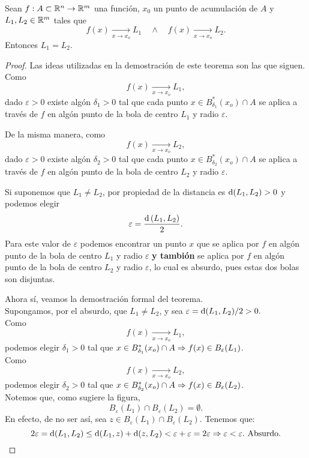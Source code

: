 \begin{theorem} \label{teo:unicidad_limite}
\mbox{}

Sean $f:A \subset \mathbb{R}^n \to \mathbb{R}^m$ una funci\'on, $x_0$ un punto de acumulaci\'on de $A$ y $L_1, L_2 \in \mathbb{R}^m$ tales que 
\[
 f(x) \xrightarrow[x \to x_o]{} L_1 \quad \wedge \quad f(x) \xrightarrow[x \to x_o]{} L_2.
\]
Entonces $L_1 = L_2$.
\begin{proof}
\mbox{}

Las ideas utilizadas en la demostraci\'on de este teorema son las que siguen.\\
Como 
\[
 f(x) \xrightarrow[x \to x_o]{} L_1,
\]
dado $\varepsilon > 0$ existe alg\'on $\delta_1 > 0$ tal que cada punto $x \in B_{\delta_1}^*(x_o) \cap A$ se aplica a trav\'es de $f$ en alg\'on punto de la bola de centro $L_1$ y radio $\varepsilon$.

\def\Ro{2.0}
\def\Rb{1.0}
\def\Ra{3.0}
\def\sep{1.0*\Ro}




De la misma manera, como 
\[
 f(x) \xrightarrow[x \to x_o]{} L_2,
\]
dado $\varepsilon > 0$ existe alg\'on $\delta_2 > 0$ tal que cada punto $x \in B_{\delta_2}^*(x_o) \cap A$ se aplica a trav\'es de $f$ en alg\'on punto de la bola de centro $L_2$ y radio $\varepsilon$.



Si suponemos que $L_1 \ne L_2$, por propiedad de la distancia es $\operatorname{d}(L_1,L_2) > 0$ y podemos elegir 
\[
 \varepsilon = \frac{\operatorname{d}{(L_1,L_2)}}{2}.
\]
Para este valor de $\varepsilon$ podemos encontrar un punto $x$ que se aplica por $f$ en alg\'on punto de la bola de centro $L_1$ y radio $\varepsilon$ \textbf{y tambi\'on} se aplica por $f$ en alg\'on punto de la bola de centro $L_2$ y radio $\varepsilon$, lo cual es absurdo, pues estas dos bolas son disjuntas.



Ahora s\'i, veamos la demostraci\'on formal del teorema.\\
 Supongamos, por el absurdo, que $L_1 \ne L_2$, y sea $\varepsilon = \operatorname{d}(L_1,L_2)/2 > 0.$ \\ 
 Como 
 \[
  f(x) \xrightarrow[x \to x_o]{} L_1,
 \]
podemos elegir $\delta_1 > 0$ tal que $x \in B_{\delta_1}^*(x_o) \cap A \Rightarrow f(x) \in B_{\varepsilon}(L_1)$.\\
Como 
\[
 f(x) \xrightarrow[x \to x_o]{} L_2,
\]
 podemos elegir $\delta_2 > 0$ tal que $x \in B_{\delta_2}^*(x_o) \cap A \Rightarrow f(x) \in B_{\varepsilon}(L_2)$.\\
 Notemos que, como sugiere la figura, 
 \[
  B_{\varepsilon}(L_1) \cap B_{\varepsilon}(L_2) = \emptyset.
 \]
 En efecto, de no ser as\'i, sea $z \in B_{\varepsilon}(L_1) \cap B_{\varepsilon}(L_2)$. Tenemos que:
 \[
  2 \varepsilon = \operatorname{d}(L_1,L_2) \le \operatorname{d}(L_1,z) + \operatorname{d}(z,L_2)
  < \varepsilon + \varepsilon = 2 \varepsilon \Rightarrow \varepsilon < \varepsilon. \text{ Absurdo.}
 \]


\end{proof}
\end{theorem}
